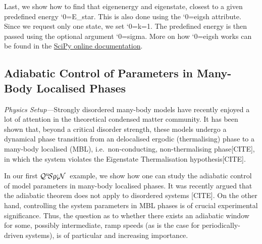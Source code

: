 \documentclass{SciPost}
\newcommand\0{\scalebox{-1}[1]{0}}
\let\svttfamily\ttfamily
\renewcommand\ttfamily{\svttfamily\catcode`0=\active }
\renewcommand\texttt{\bgroup\ttfamily\texttthelp}
\def\texttthelp#1{#1\egroup}
\newcommand{\qspin}{$\mathcal{Q}^{\mathrm{u}}\!\mathcal{S}\uprho\mathrm{\text{\textexclamdown}}\mathcal{N}$}
\begin{document}
%
Last, we show how to find that eigenenergy and eigenstate, closest to a given predefined energy \texttt{E\_star}. This is also done using the \texttt{eigsh} attribute. Since we request only one state, we set \texttt{k=1}. The predefined energy is then passed using the optional argument \texttt{sigma}. More on how \texttt{eigsh} works can be found in the \href{http://docs.scipy.org/doc/scipy-0.14.0/reference/generated/scipy.sparse.linalg.eigsh.html}{ SciPy online documentation}. 


\subsection{Adiabatic Control of Parameters in Many-Body Localised Phases}
\label{subsec:MBL}

\emph{Physics Setup---}Strongly  disordered many-body models have recently enjoyed a lot of attention in the theoretical condensed matter community. It has been shown that, beyond a critical disorder strength, these models undergo a dynamical phase transition from an delocalised ergodic (thermalising) phase to a many-body localised (MBL), i.e.~non-conducting, non-thermalising phase[CITE], in which the system violates the Eigenstate Thermalisation hypothesis[CITE]. 

In our first \qspin\ example, we show how one can study the adiabatic control of model parameters in many-body localised phases. It was recently argued that the adiabatic theorem does not apply to disordered systems [CITE]. On the other hand, controlling the system parameters in MBL phases is of crucial experimental\cite{Schreiber15} significance. Thus, the question as to whether there exists an adiabatic window for some, possibly intermediate, ramp speeds (as is the case for periodically-driven systems\cite{weinberg_FAPT}), is of particular and increasing importance. 
\end{document}
